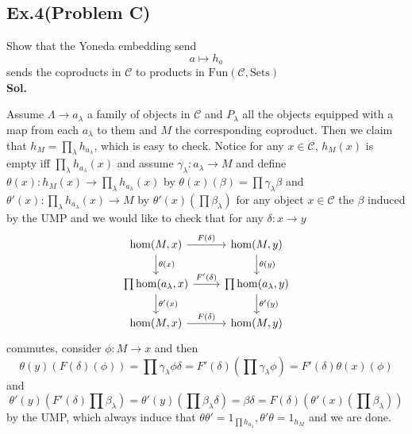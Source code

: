 \documentclass[lang=en,11pt,a4paper,citestyle =authoryear]{elegantpaper}
\begin{document}
\subsection*{Ex.4(Problem C)} 
Show that the Yoneda embedding send
\[
a\mapsto h_a
\]
sends the coproducts in $\mathcal{C}$ to products in $\text{Fun}(\mathcal{C},\text{Sets})$
\vspace{0.5em}\\
\textbf{Sol.} \par
Assume $\Lambda \to a_{\lambda}$ a family of objects in $\mathcal{C}$ and $P_{\lambda}$ all the objects equipped with a map from each $a_{\lambda}$ to them and $M$ the corresponding coproduct. Then we claim that $h_M = \prod_{\lambda} h_{a_{\lambda}}$, which is easy to check. Notice for any $x\in\mathcal{C}$, $h_M(x)$ is empty iff $\prod_{\lambda} h_{a_{\lambda}}(x)$ and assume $\gamma_{\lambda}:a_{\lambda} \to M$ and define $\theta(x):h_M(x) \to \prod_{\lambda} h_{a_{\lambda}}(x)$ by $\theta(x)(\beta) = \prod \gamma_{\lambda}\beta$ and $\theta'(x):\prod_{\lambda} h_{a_{\lambda}}(x) \to M$ by $\theta'(x)\left(\prod \beta_{\lambda}\right)$ for any object $x\in\mathcal{C}$ the $\beta$ induced by the UMP and we would like to check that for any $\delta:x\to y$
\[
\begin{tikzcd}
    \hom(M,x)\arrow[r,"F(\delta)"]\arrow[d,"\theta(x)"] & \hom(M,y)\arrow[d,"\theta(y)"] \\
    \prod \hom(a_{\lambda}, x)\arrow[d,"\theta'(x)"]\arrow[r,"F'(\delta)"] & \prod \hom(a_{\lambda}, y)\arrow[d,"\theta'(y)"] \\
    \hom(M,x)\arrow[r,"F(\delta)"] & \hom(M,y)
\end{tikzcd}
\]
commutes, consider $\phi:M\to x$ and then
\[
\theta(y)(F(\delta)(\phi)) = \prod \gamma_{\lambda}\phi\delta = F'(\delta)(\prod \gamma_{\lambda}\phi) = F'(\delta)\theta(x)(\phi)
\]
and
\[
\theta'(y)(F'(\delta)\prod \beta_{\lambda}) = \theta'(y)(\prod \beta_{\lambda}\delta) = \beta\delta = F(\delta)(\theta'(x)(\prod \beta_{\lambda}))
\]
by the UMP, which always induce that $\theta\theta' = 1_{\prod h_{a_{\lambda}}}, \theta'\theta  = 1_{h_M}$ and we are done.
\par 
\vspace{0.5em}
\end{document}
